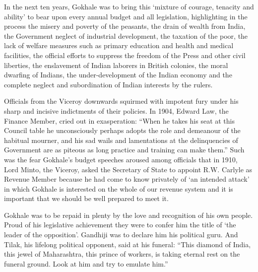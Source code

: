 \begin{multicols}{2}
In the next ten years, Gokhale was to bring this `mixture of courage, tenacity and ability' to bear upon every annual budget and all legislation, highlighting in the process the misery and poverty of the peasants, the drain of wealth from India, the Government neglect of industrial development, the taxation of the poor, the lack of welfare measures such as primary education and health and medical facilities, the official efforts to suppress the freedom of the Press and other civil liberties, the enslavement of Indian laborers in British colonies, the moral dwarfing of Indians, the under-development of the Indian economy and the complete neglect and subordination of Indian interests by the rulers.

Officials from the Viceroy downwards squirmed with impotent fury under his sharp and incisive indictments of their policies. In 1904, Edward Law, the Finance Member, cried out in exasperation: ``When he takes his seat at this Council table he unconsciously perhaps adopts the role and demeanour of the habitual mourner, and his sad wails and lamentations at the delinquencies of Government are as piteous as long practice and training can make them.'' Such was the fear Gokhale's budget speeches aroused among officials that in 1910, Lord Minto, the Viceroy, asked the Secretary of State to appoint R.W. Carlyle as Revenue Member because he had come to know privately of `an intended attack' in which Gokhale is interested on the whole of our revenue system and it is important that we should be well prepared to meet it.

Gokhale was to be repaid in plenty by the love and recognition of his own people. Proud of his legislative achievement they were to confer him the title of `the leader of the opposition'. Gandhiji was to declare him his political guru. And Tilak, his lifelong political opponent, said at his funeral: ``This diamond of India, this jewel of Maharashtra, this prince of workers, is taking eternal rest on the funeral ground. Look at him and try to emulate him.''
\end{multicols}